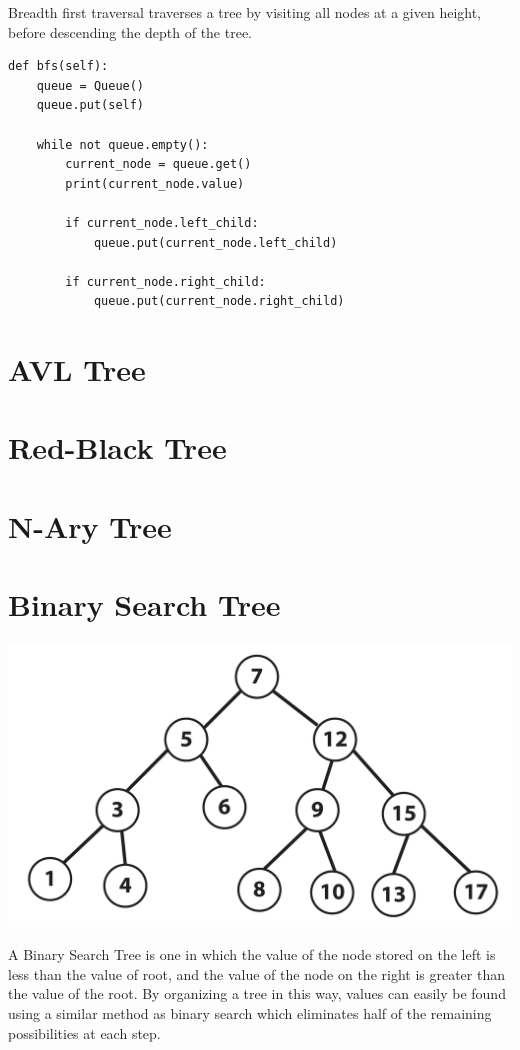 \documentclass[11pt]{article}
\begin{document}
Breadth first traversal traverses a tree by visiting all nodes at a given height, before descending the depth of the tree.

\begin{lstlisting}
def bfs(self):
    queue = Queue()
    queue.put(self)

    while not queue.empty():
        current_node = queue.get()
        print(current_node.value)

        if current_node.left_child:
            queue.put(current_node.left_child)

        if current_node.right_child:
            queue.put(current_node.right_child)
\end{lstlisting}

\section{AVL Tree}
\section{Red-Black Tree}
\section{N-Ary Tree}
\section{Binary Search Tree}
\begin{center}
    \includegraphics[width=250 px]{img/binarysearchtree}  \\
\end{center}

A Binary Search Tree is one in which the value of the node stored on the left is less than the value of root, and the value of the node on the right is greater than the value of the root. By organizing a tree in this way, values can easily be found using a similar method as binary search which eliminates half of the remaining possibilities at each step.
\end{document}
